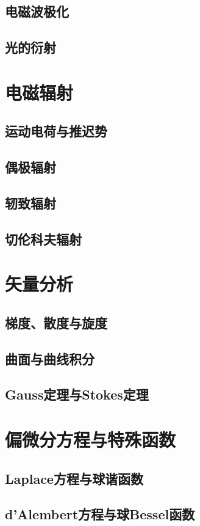 \documentclass[b5paper]{book}
\begin{document}
\section{电磁波极化}
\section{光的衍射}

\chapter{电磁辐射}
\section{运动电荷与推迟势}
\section{偶极辐射}
\section{轫致辐射}
\section{切伦科夫辐射}


\appendix
\chapter{矢量分析}
\label{app:vector_analysis}

\section{梯度、散度与旋度}

\section{曲面与曲线积分}

\section{Gauss定理与Stokes定理}

\chapter{偏微分方程与特殊函数}
\label{app:pde}

\section{Laplace方程与球谐函数}

\section{d'Alembert方程与球Bessel函数}
\end{document}

